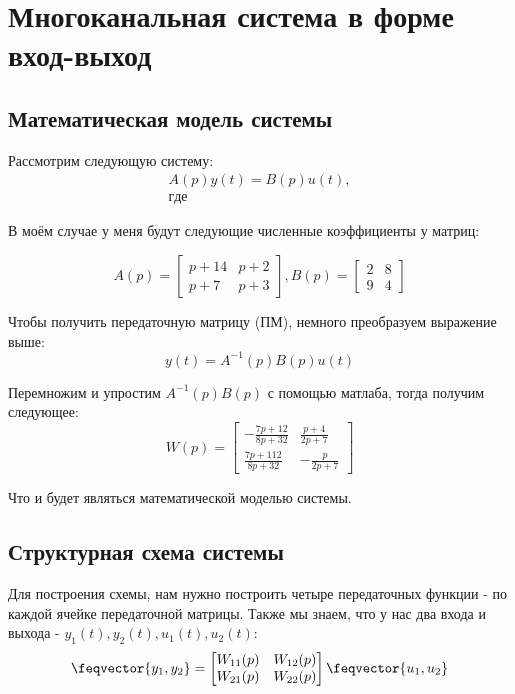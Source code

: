 \chapter{Многоканальная система в форме вход-выход}
\label{ch:chap3}
\section{Математическая модель системы}

Рассмотрим следующую систему:
$$
\begin{aligned}
A(p)y(t) = B(p)u(t), \\ где
\end{aligned}
$$

В моём случае у меня будут следующие численные коэффициенты у матриц:

$$
A(p) = \begin{bmatrix}
        p+14 & p+2  \\
        p+7 & p+3 
        \end{bmatrix} , 
B(p) = \begin{bmatrix}
        2 & 8  \\
        9 & 4 
        \end{bmatrix}
$$

Чтобы получить передаточную матрицу (ПМ), немного преобразуем выражение выше:
$$
y(t) = A^{-1}(p)B(p)u(t)
$$

Перемножим и упростим $A^{-1}(p)B(p)$ с помощью матлаба, тогда получим следующее:
$$
W(p) = \begin{bmatrix}
          -\frac{7p+12}{8p+32} & \frac{p+4}{2p+7}  \\
          \frac{7p + 112}{8p + 32} & -\frac{p}{2p+7} 
        \end{bmatrix}
$$

Что и будет являться математической моделью системы.

\section{Структурная схема системы}

Для построения схемы, нам нужно построить четыре передаточных функции - по каждой ячейке передаточной матрицы. 
Также мы знаем, что у нас два входа и выхода - $y_1(t), y_2(t), u_1(t), u_2(t)$:
$$
\feqvector{y_1, y_2} = \begin{bmatrix}
  		  W_{11}(p) & W_{12}(p) \\
  		  W_{21}(p) & W_{22}(p)
  		  \end{bmatrix} 
        \feqvector{u_1, u_2}
$$

